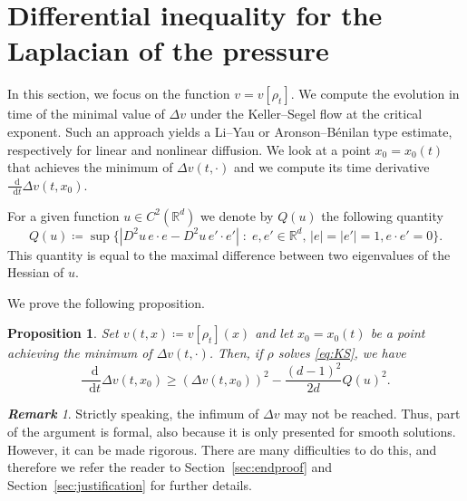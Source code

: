 \documentclass[11pt,a4paper]{article}
\numberwithin{equation}{section}
\newcommand{\R}{{\mathbb{R}}}
\theoremstyle{plain}
\newtheorem{proposition}[theorem]{Proposition}
\theoremstyle{remark}
\newtheorem{remark}[theorem]{\bf Remark}
\newcommand {\f}{\frac}
\newcommand{\diff}{\mathop{}\!\mathrm{d}}
\begin{document}
\section{Differential inequality for the Laplacian of the pressure}\label{sec:minimum_laplacian}

In this section, we focus on the function $v=v[\rho_t]$. We compute the evolution in time of the minimal value of $\Delta v$  under the Keller--Segel flow at the critical exponent. Such an approach yields a Li--Yau or Aronson--B\'enilan type estimate, respectively for linear and nonlinear diffusion. We look at a point $x_0=x_{0}(t)$ that achieves the minimum of $\Delta v(t,\cdot)$ and we compute its time derivative $\f{\diff}{\diff t} \Delta v(t,x_0)$. %

For a given function $u\in C^2(\R^d)$ we denote by $Q(u)$ the following quantity
$$Q(u)\coloneqq\sup\{|D^2u\, e\cdot e-D^2 u \, e'\cdot e'|\;:\; e,e'\in\R^d,\, |e|=|e'|=1,e\cdot e'=0\}.$$
This quantity is equal to the maximal difference between two eigenvalues of the Hessian of $u$.

We prove the following proposition.
\begin{proposition}\label{prop:preliminary_aronson_benilan}
Set $v(t,x)\coloneqq v[\rho_t](x)$
and let $x_0 = x_0(t)$ be a point achieving the minimum of $\Delta v(t,\cdot)$. Then, if $\rho$ solves \eqref{eq:KS}, we have
%
%
\[
\f{\diff}{\diff t} \Delta v(t,x_0) 
  \ge \left(\Delta v(t,x_0)\right)^2 -\f{(d-1)^2}{2d} Q(u)^2.
\]
\end{proposition}

\begin{remark}
Strictly speaking, the infimum of $\Delta v$ may not be reached. Thus, part of the argument is formal, also because it is only presented for smooth solutions. However, it can be made rigorous. There are many difficulties to do this, and therefore we refer the reader to Section~\ref{sec:endproof} and Section~\ref{sec:justification}  for further details.
\end{remark}
\end{document}
